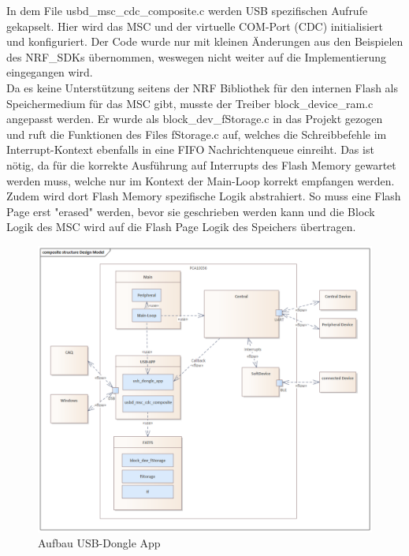 In dem File usbd\_msc\_cdc\_composite.c werden USB spezifischen Aufrufe gekapselt. Hier wird das MSC und der virtuelle COM-Port (CDC) initialisiert und konfiguriert. Der Code wurde nur mit kleinen Änderungen aus den Beispielen des NRF\_SDKs übernommen, weswegen nicht weiter auf die Implementierung eingegangen wird.\\
Da es keine Unterstützung seitens der NRF Bibliothek für den internen Flash als Speichermedium für das MSC gibt, musste der Treiber block\_device\_ram.c angepasst werden. Er wurde als block\_dev\_fStorage.c in das Projekt gezogen und ruft die Funktionen des Files fStorage.c auf, welches die Schreibbefehle im Interrupt-Kontext ebenfalls in eine FIFO Nachrichtenqueue einreiht. Das ist nötig, da für die korrekte Ausführung auf Interrupts des Flash Memory gewartet werden muss, welche nur im Kontext der Main-Loop korrekt empfangen werden. Zudem wird dort Flash Memory spezifische Logik abstrahiert. So muss eine Flash Page erst "erased" werden, bevor sie geschrieben werden kann und die Block Logik des MSC wird auf die Flash Page Logik des Speichers übertragen.

\begin{figure}[H] 
	\centering
	\includegraphics[width=\textwidth]{figures/Design_Model.png}
	\caption{Aufbau USB-Dongle App}
\end{figure}


